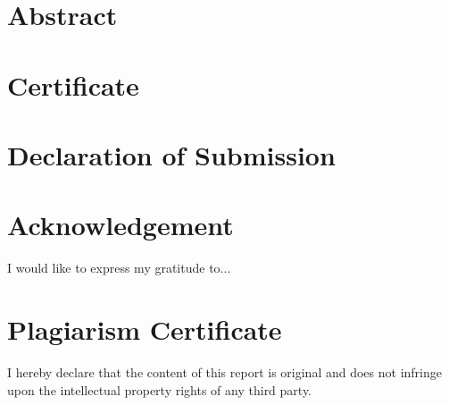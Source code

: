 \documentclass{report}[12pt]
\begin{document}
\tableofcontents

\chapter*{Abstract}

\chapter*{Certificate}

\chapter*{Declaration of Submission}

\chapter*{Acknowledgement}
I would like to express my gratitude to...

\chapter*{Plagiarism Certificate}

I hereby declare that the content of this report is original and does not infringe upon the intellectual property rights of any third party.

























\nocite{diel2016communication, mohammad2017devops, rodriguez2012distributed, zolkifli2018version}
\end{document}
